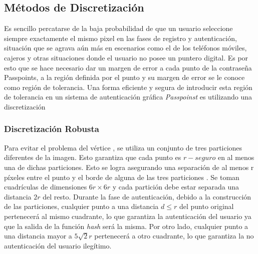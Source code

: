 \subsection{M\'etodos de Discretizaci\'on}	
Es sencillo percatarse de la baja probabilidad de que un usuario seleccione siempre exactamente el mismo pixel en las fases de registro y autenticación, situación que se agrava aún más en escenarios como el de los teléfonos móviles, cajeros y otras situaciones donde el usuario no posee un puntero digital. Es por  esto que se hace necesario dar un margen de error a cada punto de la contraseña Passpoints, a la región definida por el punto y su margen de error se le conoce como región de tolerancia. Una forma eficiente y segura de introducir esta región de tolerancia en un sistema de autenticación gráfica \textit{Passpoinst} es utilizando una discretización
\subsubsection{Discretización Robusta}

Para evitar el problema del vértice \cite{birget2006graphical}, se utiliza un conjunto de tres particiones diferentes de la imagen. Esto garantiza que cada punto es $r-seguro$ en al menos una de dichas particiones. Esto se logra asegurando una separación de al menos r píxeles entre el punto y el borde de alguna de las tres particiones \cite{zhu2013security, chiasson2008centered}. Se toman cuadrículas de dimensiones \(6r \times 6r\) y cada partición debe estar separada una distancia \(2r\) del resto. Durante la fase de autenticación, debido a la construcción de las particiones, cualquier punto a una distancia \(d \leq r\) del punto original pertenecerá al mismo cuadrante, lo que garantiza la autenticación del usuario ya que la salida de la función \textit{hash} será la misma. Por otro lado, cualquier punto a una distancia mayor a \(5\sqrt{2}r\) pertenecerá a otro cuadrante, lo que garantiza la no autenticación del usuario ilegítimo.

